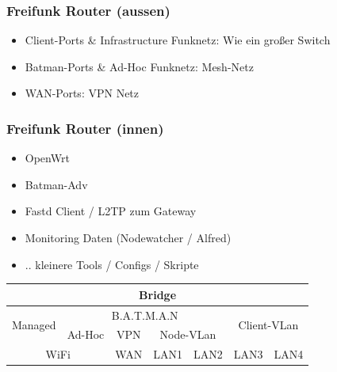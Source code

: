 \begin{frame}
\frametitle{Freifunk Router (aussen)}
    \begin{itemize}
        \item Client-Ports \& Infrastructure Funknetz:
            Wie ein großer Switch
        \item Batman-Ports \& Ad-Hoc Funknetz:
            Mesh-Netz
        \item WAN-Ports:
            VPN Netz
    \end{itemize}
\end{frame}

\begin{frame}
\frametitle{Freifunk Router (innen)}
    \begin{itemize}
        \item OpenWrt
        \item Batman-Adv
        \item Fastd Client / L2TP zum Gateway
        \item Monitoring Daten (Nodewatcher / Alfred)
        \item .. kleinere Tools / Configs / Skripte
    \end{itemize}

    \renewcommand{\arraystretch}{1.5}
    \begin{tabular}{|c|c|c|c|c|c|c|} \hline
         \multicolumn{7}{|c|}{Bridge} \\ \hline
         \multirow{2}{*}{Managed} &
         \multicolumn{4}{c|}{B.A.T.M.A.N} &
         \multicolumn{2}{c|}{\multirow{2}{*}{Client-VLan}} \\ \cline{2-5}
         & Ad-Hoc & VPN & \multicolumn{2}{c|}{Node-VLan} & \multicolumn{2}{c|}{} \\ \hline
         \multicolumn{2}{|c|}{WiFi} & WAN & LAN1 & LAN2 &
         LAN3 & LAN4 \\ \hline
    \end{tabular}
\end{frame}

